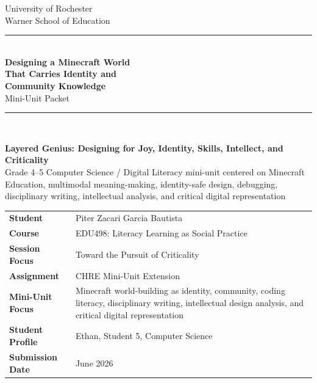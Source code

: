 \begin{titlepage}
\thispagestyle{empty}

\begin{center}
{\large University of Rochester\\}
{\normalsize Warner School of Education\\[0.35in]}

{\color{PrimaryRed}\rule{\textwidth}{1.4pt}}\\[0.22in]
{\Huge\bfseries Designing a Minecraft World\\[0.08in] That Carries Identity and\\[0.08in] Community Knowledge}\\[0.18in]
{\Large Mini-Unit Packet}\\[0.22in]
{\color{PrimaryRed}\rule{0.78\textwidth}{0.7pt}}\\[0.32in]

\colorbox{SoftBlue}{%
\parbox{0.88\textwidth}{%
\centering\vspace{0.12in}
\textbf{Layered Genius: Designing for Joy, Identity, Skills, Intellect, and Criticality}\\[0.05in]
Grade 4--5 Computer Science / Digital Literacy mini-unit centered on Minecraft Education, multimodal meaning-making, identity-safe design, debugging, disciplinary writing, intellectual analysis, and critical digital representation
\vspace{0.12in}
}%
}
\end{center}

\vspace{0.38in}

\begin{center}
\renewcommand{\arraystretch}{1.15}
\setlength{\tabcolsep}{4pt}
\begin{tabular}{>{\bfseries\RaggedLeft}p{1.65in} p{4.9in}}
Student & Piter Zacari Garcia Bautista \\
Course & EDU498: Literacy Learning as Social Practice \\
Session Focus & Toward the Pursuit of Criticality \\
Assignment & CHRE Mini-Unit Extension \\
Mini-Unit Focus & Minecraft world-building as identity, community, coding literacy, disciplinary writing, intellectual design analysis, and critical digital representation \\
Student Profile & Ethan, Student 5, Computer Science \\
Submission Date & June 2026 \\
\end{tabular}
\end{center}


\end{titlepage}
